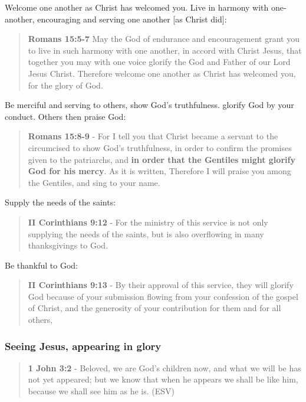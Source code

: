 \documentclass[11pt]{article}
\begin{document}
Welcome one another as Christ has welcomed you. Live in harmony with one-another, encouraging and serving one another [as Christ did]:

\begin{quote}
\textbf{Romans 15:5-7} May the God of endurance and encouragement grant you to live in such harmony with one another, in accord with Christ Jesus, that together you may with one voice glorify the God and Father of our Lord Jesus Christ. Therefore welcome one another as Christ has welcomed you, for the glory of God.
\end{quote}

Be merciful and serving to others, show God's truthfulness. glorify God by your conduct. Others then praise God:

\begin{quote}
\textbf{Romans 15:8-9} - For I tell you that Christ became a servant to the circumcised to show God's truthfulness, in order to confirm the promises given to the patriarchs, and \textbf{in order that the Gentiles might glorify God for his mercy}. As it is written, Therefore I will praise you among the Gentiles, and sing to your name.
\end{quote}

Supply the needs of the saints:

\begin{quote}
\textbf{II Corinthians 9:12} - For the ministry of this service is not only supplying the needs of the saints, but is also overflowing in many thanksgivings to God.
\end{quote}

Be thankful to God:

\begin{quote}
\textbf{II Corinthians 9:13} - By their approval of this service, they will glorify God because of your submission flowing from your confession of the gospel of Christ, and the generosity of your contribution for them and for all others,
\end{quote}

\subsubsection{Seeing Jesus, appearing in glory}
\label{sec:orgb3aa68b}
\begin{quote}
\textbf{1 John 3:2} -  Beloved, we are God's children now, and what we will be has not yet appeared; but we know that when he appears we shall be like him, because we shall see him as he is.  (ESV)
\end{quote}
\end{document}
